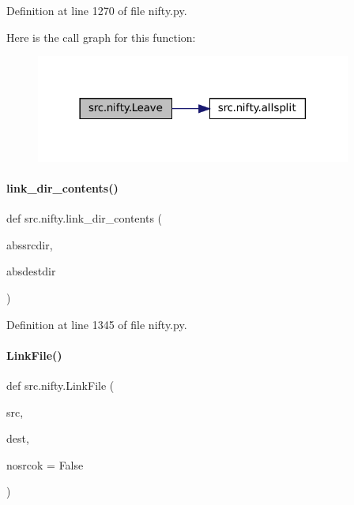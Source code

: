 Definition at line 1270 of file nifty.\+py.

Here is the call graph for this function\+:
\nopagebreak
\begin{figure}[H]
\begin{center}
\leavevmode
\includegraphics[width=294pt]{namespacesrc_1_1nifty_adef15c0f6efffef55b8c8212d5722d78_cgraph}
\end{center}
\end{figure}
\mbox{\label{namespacesrc_1_1nifty_a5592cf01ab24cb101579643160ce72cf}} 
\paragraph{\texorpdfstring{link\+\_\+dir\+\_\+contents()}{link\_dir\_contents()}}
{\footnotesize\ttfamily def src.\+nifty.\+link\+\_\+dir\+\_\+contents (\begin{DoxyParamCaption}\item[{}]{abssrcdir,  }\item[{}]{absdestdir }\end{DoxyParamCaption})}



Definition at line 1345 of file nifty.\+py.

\mbox{\label{namespacesrc_1_1nifty_a7fd3a0edb0212c320360d7685227b0f5}} 
\paragraph{\texorpdfstring{Link\+File()}{LinkFile()}}
{\footnotesize\ttfamily def src.\+nifty.\+Link\+File (\begin{DoxyParamCaption}\item[{}]{src,  }\item[{}]{dest,  }\item[{}]{nosrcok = {\ttfamily False} }\end{DoxyParamCaption})}



